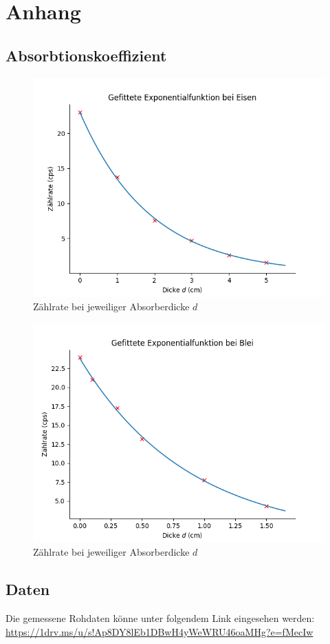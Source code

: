 

\chapter{Anhang}
\section{Absorbtionskoeffizient}

\begin{figure}[ht]
    \centering
    \includegraphics[width = 12cm]{Bilder/Auswertung/AbsorbtioskFe.png}
    \caption{Zählrate bei jeweiliger Absorberdicke $d$}
    \label{AbsorbtionkoeffFe}
\end{figure}


\begin{figure}[ht]
    \centering
    \includegraphics[width = 12cm]{Bilder/Auswertung/AbsorbtioskPb.png}
    \caption{Zählrate bei jeweiliger Absorberdicke $d$}
    \label{AbsorbtionkoeffPb}
\end{figure}



\clearpage
\section{Daten}
Die gemessene Rohdaten könne unter folgendem Link eingesehen werden:\\
\url{https://1drv.ms/u/s!Ap8DY8lEb1DBwH4yWeWRU46oaMHg?e=fMecIw}
